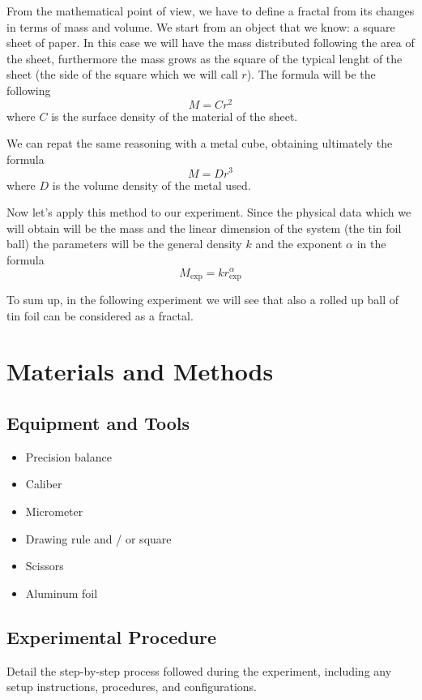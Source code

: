 \documentclass[a4paper,12pt]{article}
\begin{document}
From the mathematical point of view, we have to define a fractal from its changes 
in terms of mass and volume. We start from an object that we know: a square sheet 
of paper. In this case we will have the mass distributed following the area of 
the sheet, furthermore the mass grows as the square of the typical lenght of the 
sheet (the side of the square which we will call $r$). The formula will be the 
following 
\[ M = C r^2 \]
where $C$ is the surface density of the material of the sheet.

We can repat the same reasoning with a metal cube, obtaining ultimately the formula
\[ M = D r^3 \]
where $D$ is the volume density of the metal used. 

Now let's apply this method to our experiment. Since the physical data which we 
will obtain will be the mass and the linear dimension of the system 
(the tin foil ball) the parameters will be the general density $k$ and 
the exponent $\alpha$ in the formula
\begin{equation} 
    M_{\text{exp}} = k r_{\text{exp}}^{\alpha}
    \label{eq:gen_fractal}
\end{equation}   

To sum up, in the following experiment we will see that also a rolled up ball of 
tin foil can be considered as a fractal.


\section{Materials and Methods}
\subsection{Equipment and Tools}
\begin{itemize}
    \item Precision balance
    \item Caliber
    \item Micrometer
    \item Drawing rule and / or square
    \item Scissors
    \item Aluminum foil
\end{itemize}
\subsection{Experimental Procedure}
Detail the step-by-step process followed during the experiment, including any setup instructions, procedures, and configurations.
\end{document}

